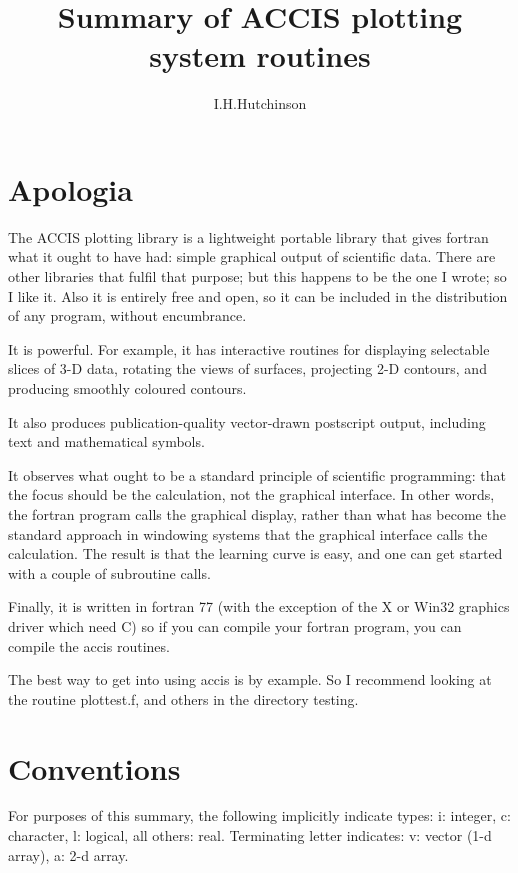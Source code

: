 \documentclass[12pt]{article}
\title{Summary of ACCIS plotting system routines}
\author{I.H.Hutchinson}
\date{}
\begin{document}
\maketitle

\tableofcontents

\section{Apologia}

The ACCIS plotting library is a lightweight portable library that
gives fortran what it ought to have had: simple graphical output of
scientific data. There are other libraries that fulfil that purpose;
but this happens to be the one I wrote; so I like it. Also it is
entirely free and open, so it can be included in the distribution of
any program, without encumbrance. 

It is powerful. For example, it has interactive routines for
displaying selectable slices of 3-D data, rotating the views of
surfaces, projecting 2-D contours, and producing smoothly coloured
contours.

It also produces publication-quality vector-drawn postscript output,
including text and mathematical symbols.

It observes what ought to be a standard principle of scientific
programming: that the focus should be the calculation, not the
graphical interface. In other words, the fortran program calls the
graphical display, rather than what has become the standard approach
in windowing systems that the graphical interface calls the
calculation. The result is that the learning curve is easy, and one
can get started with a couple of subroutine calls.

Finally, it is written in fortran 77 (with the exception of the X or
Win32 graphics driver which need C) so if you can compile your
fortran program, you can compile the accis routines.

The best way to get into using accis is by example. So I recommend
looking at the routine plottest.f, and others in the directory testing.

\section{Conventions}

For purposes of this summary, the following implicitly indicate types:
i: integer, c: character, l: logical, all others: real.  Terminating
letter indicates: v: vector (1-d array), a: 2-d array.  
\end{document}
